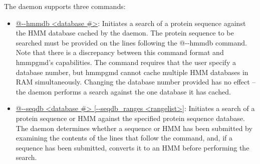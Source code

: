 \documentclass[notoc,justified]{tufte-book}    %
\begin{document}
The daemon supports three commands:

\begin{itemize}
  \item{\underline{@-{}-hmmdb <database \#>}:  Initiates a search of a protein sequence against the HMM database cached by the daemon.  The protein sequence to be searched must be provided on the lines following the @-{}-hmmdb command.  Note that there is a discrepancy between this command format and hmmpgmd's capabilities.  The command requires that the user specify a database number, but hmmpgmd cannot cache multiple HMM databases in RAM simultaneously.  Changing the database number provided has no effect -- the daemon performs a search against the one database it has cached.}
  \item{\underline{@-{}-seqdb <database \#> [-{}-seqdb\_ranges <rangelist>]}: Initiates a search of a protein sequence or HMM against the specified protein sequence database.  The daemon determines whether a sequence or HMM has been submitted by examining the contents of the lines that follow the command, and, if a sequence has been submitted, converts it to an HMM before performing the search.

}
\end{itemize}
\end{document}
